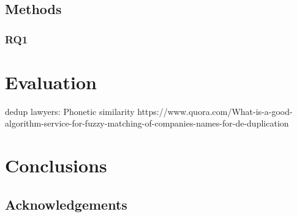 




\subsection{Methods}
\subsubsection{RQ1}
\section{Evaluation}
dedup lawyers: Phonetic similarity
https://www.quora.com/What-is-a-good-algorithm-service-for-fuzzy-matching-of-companies-names-for-de-duplication


\section{Conclusions}
\subsection{Acknowledgements}

